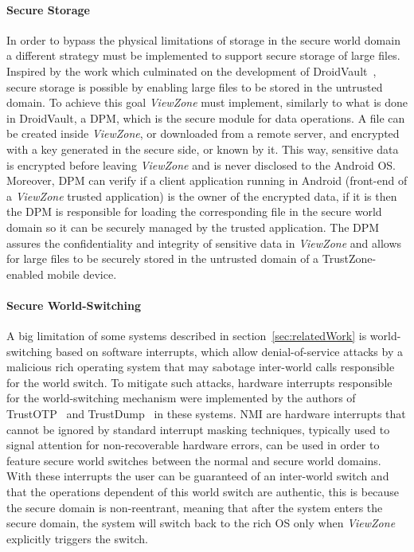 \paragraph{\textbf{Secure Storage}}

In order to bypass the physical limitations of storage in the secure world domain a different strategy must be implemented to support secure storage of large files. Inspired by the work which culminated on the development of DroidVault~\cite{li2014droidvault}, secure storage is possible by enabling large files to be stored in the untrusted domain. To achieve this goal \emph{ViewZone} must implement, similarly to what is done in DroidVault, a \ac{DPM}, which is the secure module for data operations. A file can be created inside \emph{ViewZone}, or downloaded from a remote server, and encrypted with a key generated in the secure side, or known by it. This way, sensitive data is encrypted before leaving \emph{ViewZone} and is never disclosed to the Android OS. Moreover, \ac{DPM} can verify if a client application running in Android (front-end of a \emph{ViewZone} trusted application) is the owner of the encrypted data, if it is then the \ac{DPM} is responsible for loading the corresponding file in the secure world domain so it can be securely managed by the trusted application. The \ac{DPM} assures the confidentiality and integrity of sensitive data in \emph{ViewZone} and allows for large files to be securely stored in the untrusted domain of a TrustZone-enabled mobile device.

\paragraph{\textbf{Secure World-Switching}}

A big limitation of some systems described in section~\ref{sec:relatedWork} is world-switching based on software interrupts, which allow denial-of-service attacks by a malicious rich operating system that may sabotage inter-world calls responsible for the world switch. To mitigate such attacks, hardware interrupts responsible for the world-switching mechanism were implemented by the authors of TrustOTP~\cite{sun2015trustotp} and TrustDump~\cite{sun2015reliable} in these systems. \ac{NMI} are hardware interrupts that cannot be ignored by standard interrupt masking techniques, typically used to signal attention for non-recoverable hardware errors, can be used in order to feature secure world switches between the normal and secure world domains. With these interrupts the user can be guaranteed of an inter-world switch and that the operations dependent of this world switch are authentic, this is because the secure domain is non-reentrant, meaning that after the system enters the secure domain, the system will switch back to the rich OS only when \emph{ViewZone} explicitly triggers the switch.

